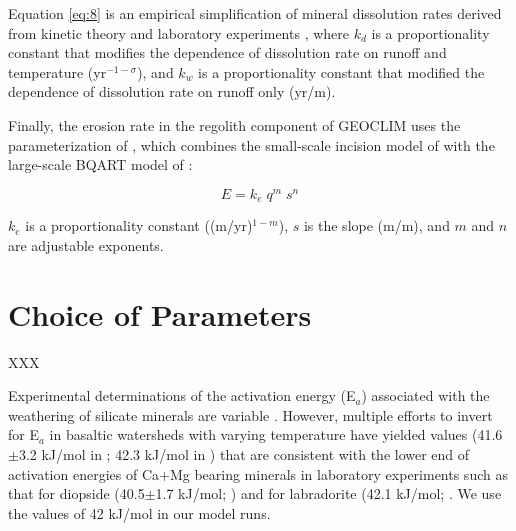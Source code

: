 \documentclass[11pt,letterpaper]{article}
\begin{document}
\noindent
Equation \ref{eq:8} is an empirical simplification of mineral dissolution rates derived from kinetic theory and laboratory experiments \citet{West2012a}, where $k_{d}$ is a proportionality constant that modifies the dependence of dissolution rate on runoff and temperature (yr$^{-1-\sigma}$), and $k_{w}$ is a proportionality constant that modified the dependence of dissolution rate on runoff only (yr/m).

Finally, the erosion rate in the regolith component of GEOCLIM uses the parameterization of \citet{Maffre2018a}, which combines the small-scale incision model of \citet{Davy2000a} with the large-scale BQART model of \citet{Syvitski2007a}:

\begin{equation}
    E = k_{e}\;q^{m}\;s^{n}
    \label{eq:9}
\end{equation}

\noindent
$k_{e}$ is a proportionality constant ((m/yr)$^{1-m}$), $s$ is the slope (m/m), and $m$ and $n$ are adjustable exponents.

\section*{Choice of Parameters}

XXX

Experimental determinations of the activation energy (E$_a$) associated with the weathering of silicate minerals are variable \citep{Brantley2003a}. However, multiple efforts to invert for E$_a$ in basaltic watersheds with varying temperature have yielded values (41.6$\pm$3.2 kJ/mol in \citealp{Li2016a}; 42.3 kJ/mol in \citealp{Dessert2001a}) that are consistent with the lower end of activation energies of Ca+Mg bearing minerals in laboratory experiments such as that for diopside (40.5$\pm$1.7 kJ/mol; \citealp{Knauss1993a}) and for labradorite (42.1 kJ/mol; \citealp{Carroll2005a}. We use the values of 42 kJ/mol in our model runs.

\clearpage

\singlespacing

\newpage



\end{document}
